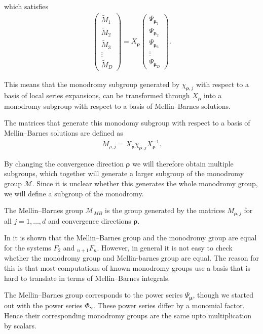which satisfies
\begin{gather*}
\begin{pmatrix}
\tilde{M}_1\\ \tilde{M}_2\\ \tilde{M}_3\\ \vdots \\ \tilde{M}_D\end{pmatrix} = X_{\bm\rho} \begin{pmatrix}\Psi_{\bm\mu_1} \\ \Psi_{\bm\mu_2} \\ \Psi_{\bm\mu_3} \\ \vdots \\ \Psi_{\bm\mu_D}
\end{pmatrix}\!.
\end{gather*}

This means that the monodromy subgroup generated by $\chi_{\bm\rho,j}$ with respect to a basis of local series expansions, can be transformed through $X_{\bm\rho}$ into a monodromy subgroup with respect to a basis of Mellin--Barnes solutions.

The matrices that generate this monodomy subgroup with respect to a basis of Mellin--Barnes solutions are defined as
\begin{gather*}
M_{\rho,j} = X_{\bm\rho}\chi_{\bm\rho,j}X_{\bm\rho}^{-1}.
\end{gather*}

By changing the convergence direction $\bm\rho$ we will therefore obtain multiple subgroups, which together will generate a larger subgroup of the monodromy group $\mathcal{M}$. Since it is unclear whether this generates the whole monodromy group, we will define a subgroup of the monodromy.

\begin{Definition}%
The Mellin--Barnes group $\mathcal{M}_{MB}$ is the group generated by the matrices $M_{\bm\rho,j}$ for all $j=1,\dots,d$ and convergence directions $\bm\rho$.
\end{Definition}

In \cite{Beu13} it is shown that the Mellin--Barnes group and the monodromy group are equal for the systems $F_2$ and ${}_{n+1}F_n$. However, in general it is not easy to check whether the monodromy group and Mellin-barnes group are equal. The reason for this is that most computations of known monodromy groups use a basis that is hard to translate in terms of Mellin--Barnes integrals.
\begin{Remark}
The Mellin--Barnes group corresponds to the power series $\Psi_{\bm\mu}$, though we started out with the power series $\Phi_{\bm\gamma}$. These power series differ by a monomial factor. Hence their corresponding monodromy groups are the same upto multiplication by scalars.
\end{Remark}

